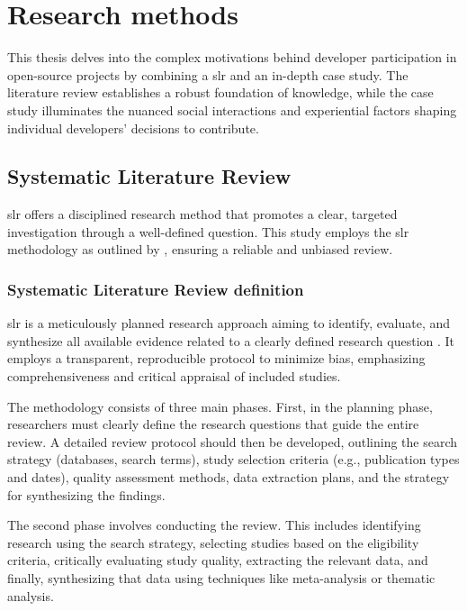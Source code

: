 \section{Research methods}

This thesis delves into the complex motivations behind developer participation in open-source projects by combining a \ac{slr} and an in-depth case study. The literature review establishes a robust foundation of knowledge, while the case study illuminates the nuanced social interactions and experiential factors shaping individual developers' decisions to contribute.

\subsection{Systematic Literature Review} \label{slr}

\ac{slr} offers a disciplined research method that promotes a clear, targeted investigation through a well-defined question. This study employs the \ac{slr} methodology as outlined by \citet{Kitchenham}, ensuring a reliable and unbiased review.

\subsubsection{Systematic Literature Review definition}

\ac{slr} is a meticulously planned research approach aiming to identify, evaluate, and synthesize all available evidence related to a clearly defined research question \citep{Kitchenham}. It employs a transparent, reproducible protocol to minimize bias, emphasizing comprehensiveness and critical appraisal of included studies.

The methodology consists of three main phases. First, in the planning phase, researchers must clearly define the research questions that guide the entire review. A detailed review protocol should then be developed, outlining the search strategy (databases, search terms), study selection criteria (e.g., publication types and dates), quality assessment methods, data extraction plans, and the strategy for synthesizing the findings.

The second phase involves conducting the review. This includes identifying research using the search strategy, selecting studies based on the eligibility criteria, critically evaluating study quality, extracting the relevant data, and finally, synthesizing that data using techniques like meta-analysis or thematic analysis.

